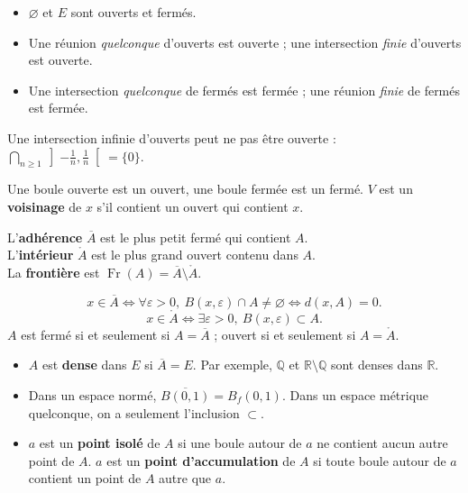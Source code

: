 \documentclass[11pt]{article}
\newcommand{\R}{\mathbb{R}}
\begin{document}
\begin{lthm}[Stabilité]
\begin{itemize}
\item $\varnothing$ et $E$ sont ouverts et fermés.
\item Une réunion \emph{quelconque} d'ouverts est ouverte ; une intersection \emph{finie} d'ouverts est ouverte.
\item Une intersection \emph{quelconque} de fermés est fermée ; une réunion \emph{finie} de fermés est fermée.
\end{itemize}
\end{lthm}

\begin{lnote}[Attention]
Une intersection infinie d'ouverts peut ne pas être ouverte : $\bigcap_{n\geq1}\left]-\frac1n,\frac1n\right[ = \{0\}$.
\end{lnote}

Une boule ouverte est un ouvert, une boule fermée est un fermé. $V$ est un \textbf{voisinage} de $x$ s'il contient un ouvert qui contient $x$.


\begin{ldef}
L'\textbf{adhérence} $\overline A$ est le plus petit fermé qui contient $A$. \\
L'\textbf{intérieur} $\mathring A$ est le plus grand ouvert contenu dans $A$. \\
La \textbf{frontière} est $\operatorname{Fr}(A) = \overline A\setminus\mathring A$.
\end{ldef}

\begin{lthm}[Caractérisations]
\[x\in\overline A\iff\forall\varepsilon>0,\ B(x,\varepsilon)\cap A\neq\varnothing\iff d(x,A) = 0.\]
\[x\in\mathring A\iff\exists\varepsilon>0,\ B(x,\varepsilon)\subset A.\]
$A$ est fermé si et seulement si $A = \overline A$ ; ouvert si et seulement si $A = \mathring A$.
\end{lthm}

\begin{itemize}
\item $A$ est \textbf{dense} dans $E$ si $\overline A = E$. Par exemple, $\mathbb{Q}$ et $\R\setminus\mathbb{Q}$ sont denses dans $\R$.
\item Dans un espace normé, $\overline{B(0,1)} = B_f(0,1)$. Dans un espace métrique quelconque, on a seulement l'inclusion $\subset$.
\item $a$ est un \textbf{point isolé} de $A$ si une boule autour de $a$ ne contient aucun autre point de $A$. $a$ est un \textbf{point d'accumulation} de $A$ si toute boule autour de $a$ contient un point de $A$ autre que $a$.
\end{itemize}
\end{document}
